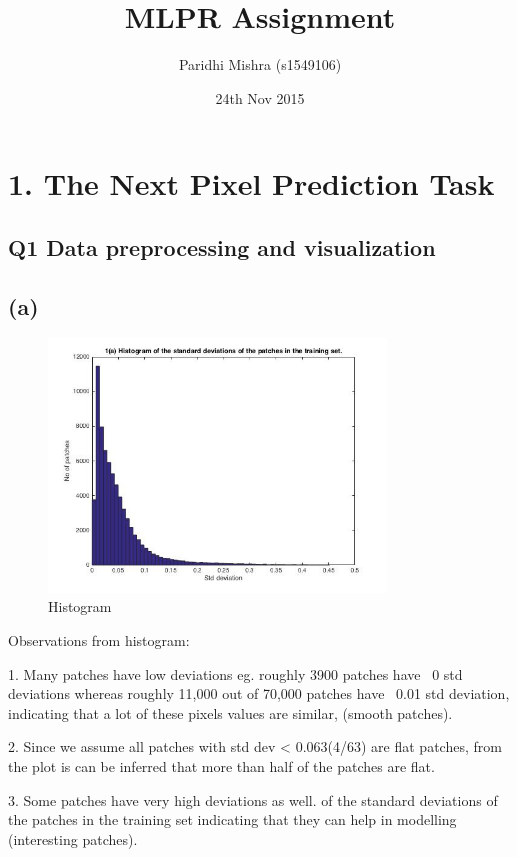 \documentclass[english]{article}
\begin{document}
\title{MLPR Assignment}
\author{Paridhi Mishra (s1549106)}
\date{24th Nov 2015}
\maketitle
\section*{1. The Next Pixel Prediction Task}
\subsection*{Q1 Data preprocessing and visualization }
\subsection*{(a)}
\begin{figure}[h!]
  \caption{Histogram}
  \centering
    \includegraphics[width=0.8\textwidth]{fig_1_1_a.jpg}
\end{figure}

Observations from histogram:

1. Many patches have low deviations eg. roughly 3900 patches have ~0 std deviations whereas
 roughly 11,000 out of 70,000 patches have ~0.01 std deviation, indicating
 that a lot of these pixels values are similar, (smooth patches).
 
2. Since we assume all patches with std dev < 0.063(4/63) are flat
 patches, from the plot is can be inferred that more than half of the patches
 are flat.
 
3. Some patches have very high deviations as well. of the standard deviations of the patches in the training set indicating that they can help in modelling (interesting patches).
\end{document}
